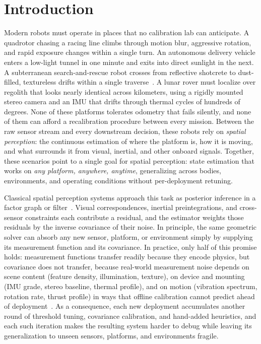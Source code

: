 \chapter{Introduction} \label{chapter:introduction}

Modern robots must operate in places that no calibration lab can anticipate.
A quadrotor chasing a racing line climbs through motion blur, aggressive rotation, and rapid exposure changes within a single turn.
An autonomous delivery vehicle enters a low-light tunnel in one minute and exits into direct sunlight in the next.
A subterranean search-and-rescue robot crosses from reflective shotcrete to dust-filled, textureless drifts within a single traverse~\cite{zhao2023subt}.
A lunar rover must localize over regolith that looks nearly identical across kilometers, using a rigidly mounted stereo camera and an IMU that drifts through thermal cycles of hundreds of degrees.
None of these platforms tolerates odometry that fails silently, and none of them can afford a recalibration procedure between every mission.
Between the raw sensor stream and every downstream decision, these robots rely on \textit{spatial perception}: the continuous estimation of where the platform is, how it is moving, and what surrounds it from visual, inertial, and other onboard signals.
Together, these scenarios point to a single goal for spatial perception: state estimation that works on \textit{any platform, anywhere, anytime}, generalizing across bodies, environments, and operating conditions without per-deployment retuning.

Classical spatial perception systems approach this task as posterior inference in a factor graph or filter~\cite{barfoot2017state, cadena2016past}.
Visual correspondences, inertial preintegrations, and cross-sensor constraints each contribute a residual, and the estimator weights those residuals by the inverse covariance of their noise.
In principle, the same geometric solver can absorb any new sensor, platform, or environment simply by supplying its measurement function and its covariance.
In practice, only half of this promise holds: measurement functions transfer readily because they encode physics, but covariance does not transfer, because real-world measurement noise depends on scene content (feature density, illumination, texture), on device and mounting (IMU grade, stereo baseline, thermal profile), and on motion (vibration spectrum, rotation rate, thrust profile) in ways that offline calibration cannot predict ahead of deployment~\cite{rehder2016extending, qin2018vins}.
As a consequence, each new deployment accumulates another round of threshold tuning, covariance calibration, and hand-added heuristics, and each such iteration makes the resulting system harder to debug while leaving its generalization to unseen sensors, platforms, and environments fragile.

